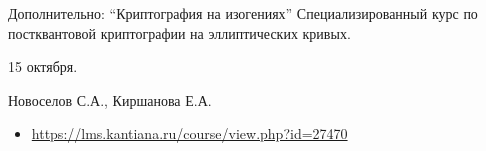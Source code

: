 \documentclass{beamer}
\begin{document}
\begin{frame}{Дополнительно: ``Криптография на изогениях''}
	Специализированный курс по постквантовой криптографии на эллиптических кривых.
	
	\vspace{1em}
	
	 15 октября.
	
	\vspace{1em}
	
	 Новоселов С.А., Киршанова Е.А.
	
	\vspace{1em}

	
	
	\begin{itemize}
		\item{\footnotesize
			\url{https://lms.kantiana.ru/course/view.php?id=27470}
		}
	\end{itemize}
\end{frame}
\end{document}
